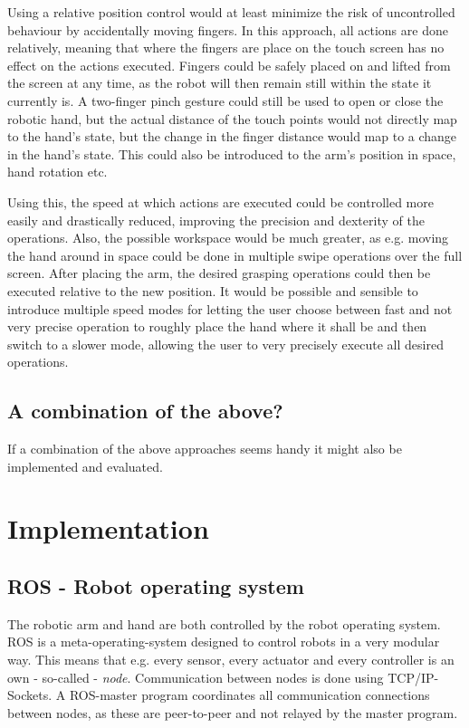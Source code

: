 \documentclass[a4paper]{article}
\begin{document}
Using a relative position control would at least minimize the risk of uncontrolled behaviour by accidentally moving fingers. In this approach, all actions are done relatively, meaning that where the fingers are place on the touch screen has no effect on the actions executed. Fingers could be safely placed on and lifted from the screen at any time, as the robot will then remain still within the state it currently is. A two-finger pinch gesture could still be used to open or close the robotic hand, but the actual distance of the touch points would not directly map to the hand's state, but the change in the finger distance would map to a change in the hand's state. This could also be introduced to the arm's position in space, hand rotation etc.

Using this, the speed at which actions are executed could be controlled more easily and drastically reduced, improving the precision and dexterity of the operations. Also, the possible workspace would be much greater, as e.g. moving the hand around in space could be done in multiple swipe operations over the full screen. After placing the arm, the desired grasping operations could then be executed relative to the new position. It would be possible and sensible to introduce multiple speed modes for letting the user choose between fast and not very precise operation to roughly place the hand where it shall be and then switch to a slower mode, allowing the user to very precisely execute all desired operations.

\subsection{A combination of the above?}

If a combination of the above approaches seems handy it might also be implemented and evaluated. 

\section{Implementation}
\label{sec:impl}
\subsection{ROS - Robot operating system}

The robotic arm and hand are both controlled by the robot operating system. ROS is a meta-operating-system designed to control robots in a very modular way. This means that e.g. every sensor, every actuator and every controller is an own - so-called - \textit{node}. Communication between nodes is done using TCP/IP-Sockets. A ROS-master program coordinates all communication connections between nodes, as these are peer-to-peer and not relayed by the master program.
\end{document}
